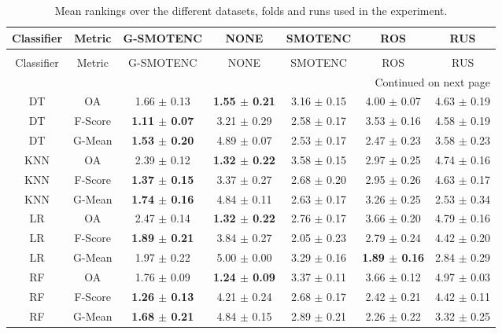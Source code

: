 \begin{longtable}{ccccccc}
\caption{Mean rankings over the different datasets, folds and runs used in the experiment.}
\label{tbl:mean_sem_ranks}\\
\toprule
Classifier &  Metric &                G-SMOTENC &                     NONE &         SMOTENC &                      ROS &             RUS \\
\midrule
\endfirsthead
\caption[]{Mean rankings over the different datasets, folds and runs used in the experiment.} \\
\toprule
Classifier &  Metric &                G-SMOTENC &                     NONE &         SMOTENC &                      ROS &             RUS \\
\midrule
\endhead
\midrule
\multicolumn{7}{r}{{Continued on next page}} \\
\midrule
\endfoot

\bottomrule
\endlastfoot
        DT &      OA &          1.66 $\pm$ 0.13 & \textbf{1.55 $\pm$ 0.21} & 3.16 $\pm$ 0.15 &          4.00 $\pm$ 0.07 & 4.63 $\pm$ 0.19 \\
        DT & F-Score & \textbf{1.11 $\pm$ 0.07} &          3.21 $\pm$ 0.29 & 2.58 $\pm$ 0.17 &          3.53 $\pm$ 0.16 & 4.58 $\pm$ 0.19 \\
        DT &  G-Mean & \textbf{1.53 $\pm$ 0.20} &          4.89 $\pm$ 0.07 & 2.53 $\pm$ 0.17 &          2.47 $\pm$ 0.23 & 3.58 $\pm$ 0.23 \\
       KNN &      OA &          2.39 $\pm$ 0.12 & \textbf{1.32 $\pm$ 0.22} & 3.58 $\pm$ 0.15 &          2.97 $\pm$ 0.25 & 4.74 $\pm$ 0.16 \\
       KNN & F-Score & \textbf{1.37 $\pm$ 0.15} &          3.37 $\pm$ 0.27 & 2.68 $\pm$ 0.20 &          2.95 $\pm$ 0.26 & 4.63 $\pm$ 0.17 \\
       KNN &  G-Mean & \textbf{1.74 $\pm$ 0.16} &          4.84 $\pm$ 0.11 & 2.63 $\pm$ 0.17 &          3.26 $\pm$ 0.25 & 2.53 $\pm$ 0.34 \\
        LR &      OA &          2.47 $\pm$ 0.14 & \textbf{1.32 $\pm$ 0.22} & 2.76 $\pm$ 0.17 &          3.66 $\pm$ 0.20 & 4.79 $\pm$ 0.16 \\
        LR & F-Score & \textbf{1.89 $\pm$ 0.21} &          3.84 $\pm$ 0.27 & 2.05 $\pm$ 0.23 &          2.79 $\pm$ 0.24 & 4.42 $\pm$ 0.20 \\
        LR &  G-Mean &          1.97 $\pm$ 0.22 &          5.00 $\pm$ 0.00 & 3.29 $\pm$ 0.16 & \textbf{1.89 $\pm$ 0.16} & 2.84 $\pm$ 0.29 \\
        RF &      OA &          1.76 $\pm$ 0.09 & \textbf{1.24 $\pm$ 0.09} & 3.37 $\pm$ 0.11 &          3.66 $\pm$ 0.12 & 4.97 $\pm$ 0.03 \\
        RF & F-Score & \textbf{1.26 $\pm$ 0.13} &          4.21 $\pm$ 0.24 & 2.68 $\pm$ 0.17 &          2.42 $\pm$ 0.21 & 4.42 $\pm$ 0.11 \\
        RF &  G-Mean & \textbf{1.68 $\pm$ 0.21} &          4.84 $\pm$ 0.15 & 2.89 $\pm$ 0.21 &          2.26 $\pm$ 0.22 & 3.32 $\pm$ 0.25 \\
\end{longtable}
